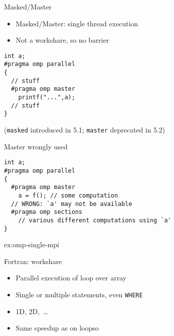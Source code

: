 \begin{numberedframe}{Masked/Master}
  \begin{itemize}
  \item Masked/Master: single thread execution
  \item Not a workshare, so no barrier
  \end{itemize}
\begin{lstlisting}
int a;
#pragma omp parallel
{
  // stuff
  #pragma omp master
    printf("...",a);
  // stuff
}
\end{lstlisting}
(\lstinline{masked} introduced in 5.1; \lstinline{master} deprecated in 5.2)
\end{numberedframe}

\begin{numberedframe}{Master wrongly used}
\begin{lstlisting}
int a;
#pragma omp parallel
{
  #pragma omp master
    a = f(); // some computation
  // WRONG: `a' may not be available
  #pragma omp sections
    // various different computations using `a'
}
\end{lstlisting}
\end{numberedframe}

\begin{exerciseframe}
   {ex:omp-single-mpi}
\end{exerciseframe}

\begin{fortran}
\begin{numberedframe}{Fortran: workshare}
  \begin{itemize}
  \item Parallel execution of loop over array
   \item Single or multiple statements, even \lstinline{WHERE}
  \item 1D, 2D,~\ldots
  \item Same speedup as on loopso
  \end{itemize}
\end{numberedframe}
\end{fortran}

\endinput

\begin{numberedframe}{}
  \begin{itemize}
  \item 
  \end{itemize}
\end{numberedframe}

\begin{numberedframe}{}
  \begin{itemize}
  \item 
  \end{itemize}
\end{numberedframe}

\begin{numberedframe}{}
  \begin{itemize}
  \item 
  \end{itemize}
\end{numberedframe}

\begin{numberedframe}{}
  \begin{itemize}
  \item 
  \end{itemize}
\end{numberedframe}


